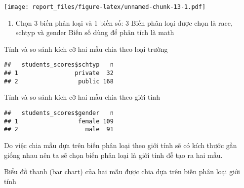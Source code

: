 \documentclass[
]{article}
\newenvironment{Shaded}{\begin{snugshade}}{\end{snugshade}}
\newcommand{\DataTypeTok}[1]{\textcolor[rgb]{0.13,0.29,0.53}{#1}}
\newcommand{\DecValTok}[1]{\textcolor[rgb]{0.00,0.00,0.81}{#1}}
\newcommand{\KeywordTok}[1]{\textcolor[rgb]{0.13,0.29,0.53}{\textbf{#1}}}
\newcommand{\NormalTok}[1]{#1}
\newcommand{\OperatorTok}[1]{\textcolor[rgb]{0.81,0.36,0.00}{\textbf{#1}}}
\newcommand{\StringTok}[1]{\textcolor[rgb]{0.31,0.60,0.02}{#1}}
\providecommand{\tightlist}{%
  \setlength{\itemsep}{0pt}\setlength{\parskip}{0pt}}
\begin{document}
\texttt{[image: report\_files/figure-latex/unnamed-chunk-13-1.pdf]}

\begin{enumerate}
\def\labelenumi{\arabic{enumi}.}
\setcounter{enumi}{2}
\tightlist
\item
  Chọn 3 biến phân loại và 1 biến số: 3 Biến phân loại được chọn là
  race, schtyp và gender Biến số dùng để phân tích là math
\end{enumerate}

Tính và so sánh kích cỡ hai mẫu chia theo loại trường

\begin{Shaded}
\end{Shaded}

\begin{verbatim}
##   students_scores$schtyp   n
## 1                private  32
## 2                 public 168
\end{verbatim}

Tính và so sánh kích cỡ hai mẫu chia theo giới tính

\begin{Shaded}
\end{Shaded}

\begin{verbatim}
##   students_scores$gender   n
## 1                 female 109
## 2                   male  91
\end{verbatim}

Do việc chia mẫu dựa trên biến phân loại theo giới tính sẽ có kích thước
gần giống nhau nên ta sẽ chọn biến phân loại là giới tính đễ tạo ra hai
mẫu.

Biểu đồ thanh (bar chart) của hai mẫu được chia dựa trên biến phân loại
giới tính

\begin{Shaded}
\end{Shaded}
\end{document}
